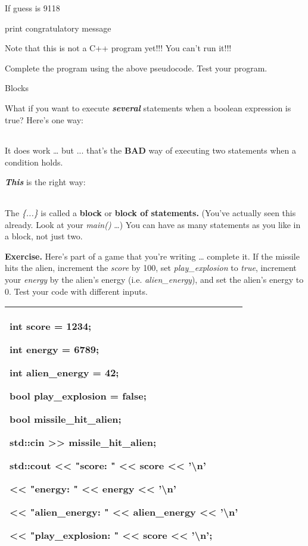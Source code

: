 \documentclass[
]{article}
\begin{document}
If guess is 9118

print congratulatory message

Note that this is not a C++ program yet!!! You can't run it!!!

Complete the program using the above pseudocode. Test your program.

Blocks

What if you want to execute \emph{\textbf{several}} statements when a
boolean expression is true? Here's one way:

\begin{longtable}[]{@{}@{}}
\toprule
\endhead
\bottomrule
\end{longtable}

It does work \ldots{} but ... that's the \textbf{BAD} way of executing
two statements when a condition holds.

\emph{\textbf{This}} is the right way:

\begin{longtable}[]{@{}@{}}
\toprule
\endhead
\bottomrule
\end{longtable}

The \emph{\{...\}} is called a \textbf{block} or \textbf{block of
statements. }(You've actually seen this already. Look at your
\emph{main()} \ldots) You can have as many statements as you like in a
block, not just two.

\textbf{Exercise.} Here's part of a game that you're writing \ldots{}
complete it. If the missile hits the alien, increment the \emph{score}
by 100, set \emph{play\_explosion} to \emph{true}, increment your
\emph{energy} by the alien's energy (i.e. \emph{alien\_energy}), and set
the alien's energy to 0. Test your code with different inputs.

\begin{longtable}[]{@{}l@{}}
\toprule
\endhead
\begin{minipage}[t]{0.97\columnwidth}\raggedright
int score = 1234;

int energy = 6789;

int alien\_energy = 42;

bool play\_explosion = false;

bool missile\_hit\_alien;

std::cin \textgreater\textgreater{} missile\_hit\_alien;

std::cout \textless\textless{} "score: " \textless\textless{} score
\textless\textless{} '\textbackslash n'

\textless\textless{} "energy: " \textless\textless{} energy
\textless\textless{} '\textbackslash n'

\textless\textless{} "alien\_energy: " \textless\textless{}
alien\_energy \textless\textless{} '\textbackslash n'

\textless\textless{} "play\_explosion: " \textless\textless{} score
\textless\textless{} '\textbackslash n';\strut
\end{minipage}\tabularnewline
\bottomrule
\end{longtable}
\end{document}
